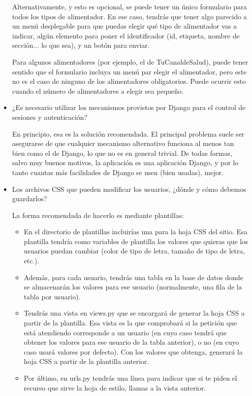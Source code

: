 \begin{itemize}
  Alternativamente, y esto es opcional, se puede tener un único formulario para todos los tipos de alimentador. En ese caso, tendrás que tener algo parecido a un menú desplegable para que puedas elegir qué tipo de alimentador vas a indicar, algún elemento para poner el identificador (id, etiqueta, nombre de sección... lo que sea), y un botón para enviar.

  Para algunos alimentadores (por ejemplo, el de TuCanaldeSalud), puede tener sentido que el formulario incluya un menú par elegir el alimentador, pero este no es el caso de ninguno de los alimentadores obligatorios. Puede ocurrir esto cuando el número de alimentadores a elegir sea pequeño.
  
\item ¿Es necesario utilizar los mecanismos provistos por Django para el control de sesiones y autenticación?

  En principio, esa es la solución recomendada. El principal problema suele ser asegurarse de que cualquier mecanismo alternativo funciona al menos tan bien como el de Django, lo que no es en general trivial. De todas formas, salvo muy buenos motivos, la aplicación es una aplicación Django, y por lo tanto cuantas más facilidades de Django se usen (bien usadas), mejor.

\item Los archivos CSS que pueden modificar los usuarios, ¿dónde y cómo debemos guardarlos?

  La forma recomendada de hacerlo es mediante plantillas:

  \begin{itemize}
  \item En el directorio de plantillas incluirías una para la hoja CSS del sitio. Esa plantilla tendría como variables de plantilla los valores que quieras que los usuarios puedan cambiar (color de tipo de letra, tamaño de tipo de letra, etc.).
  \item Además, para cada usuario, tendrás una tabla en la base de datos donde se almacenarán los valores para ese usuario (normalmente, una fila de la tabla por usuario).
  \item Tendrás una vista en views.py que se encargará de generar la hoja CSS a partir de la plantilla. Esa vista es la que comprobará si la petición que está atendiendo corresponde a un usuario (en cuyo caso tendrá que obtener los valores para ese usuario de la tabla anterior), o no (en cuyo caso usará valores por defecto). Con los valores que obtenga, generará la hoja CSS a partir de la plantilla anterior.
  \item Por último, en urls.py tendrás una línea para indicar que si te piden el recurso que sirve la hoja de estilo, llamas a la vista anterior.
  \end{itemize}


\end{itemize}
